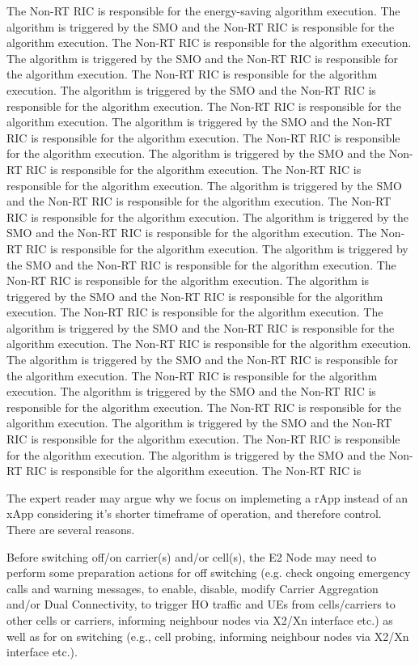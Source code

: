 The Non-RT RIC is responsible for the energy-saving algorithm execution. The algorithm is triggered by the SMO and the Non-RT RIC is responsible for the algorithm execution. The Non-RT RIC is responsible for the algorithm execution. The algorithm is triggered by the SMO and the Non-RT RIC is responsible for the algorithm execution. The Non-RT RIC is responsible for the algorithm execution. The algorithm is triggered by the SMO and the Non-RT RIC is responsible for the algorithm execution. The Non-RT RIC is responsible for the algorithm execution. The algorithm is triggered by the SMO and the Non-RT RIC is responsible for the algorithm execution. The Non-RT RIC is responsible for the algorithm execution. The algorithm is triggered by the SMO and the Non-RT RIC is responsible for the algorithm execution. The Non-RT RIC is responsible for the algorithm execution. The algorithm is triggered by the SMO and the Non-RT RIC is responsible for the algorithm execution. The Non-RT RIC is responsible for the algorithm execution. The algorithm is triggered by the SMO and the Non-RT RIC is responsible for the algorithm execution. The Non-RT RIC is responsible for the algorithm execution. The algorithm is triggered by the SMO and the Non-RT RIC is responsible for the algorithm execution. The Non-RT RIC is responsible for the algorithm execution. The algorithm is triggered by the SMO and the Non-RT RIC is responsible for the algorithm execution. The Non-RT RIC is responsible for the algorithm execution. The algorithm is triggered by the SMO and the Non-RT RIC is responsible for the algorithm execution. The Non-RT RIC is responsible for the algorithm execution. The algorithm is triggered by the SMO and the Non-RT RIC is responsible for the algorithm execution. The Non-RT RIC is responsible for the algorithm execution. The algorithm is triggered by the SMO and the Non-RT RIC is responsible for the algorithm execution. The Non-RT RIC is responsible for the algorithm execution. The algorithm is triggered by the SMO and the Non-RT RIC is responsible for the algorithm execution. The Non-RT RIC is responsible for the algorithm execution. The algorithm is triggered by the SMO and the Non-RT RIC is responsible for the algorithm execution. The Non-RT RIC is

The expert reader may argue why we focus on implemeting a rApp instead of an xApp considering it's shorter timeframe of operation, and therefore control. There are several reasons. 

Before switching off/on carrier(s) and/or cell(s), the E2 Node may need to perform some preparation actions for off switching (e.g. check ongoing emergency calls and warning messages, to enable, disable, modify Carrier Aggregation and/or Dual Connectivity, to trigger HO traffic and UEs from cells/carriers to other cells or carriers, informing neighbour nodes via X2/Xn interface etc.) as well as for on switching (e.g., cell probing, informing neighbour nodes via X2/Xn interface etc.). \\

